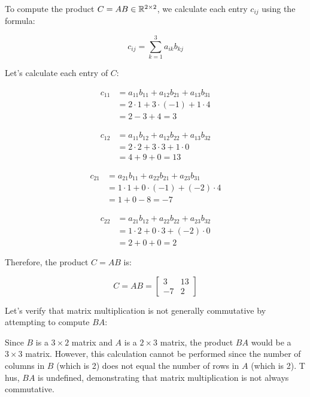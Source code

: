To compute the product \(C = AB \in \mathbb{R}^{2 \times 2}\), we calculate each entry \(c_{ij}\) using the formula:

\[
    c_{ij} = \sum_{k=1}^{3} a_{ik} b_{kj}
\]

Let's calculate each entry of \(C\):

\begin{align*}
    c_{11} & = a_{11}b_{11} + a_{12}b_{21} + a_{13}b_{31} \\
           & = 2 \cdot 1 + 3 \cdot (-1) + 1 \cdot 4       \\
           & = 2 - 3 + 4 = 3
\end{align*}

\begin{align*}
    c_{12} & = a_{11}b_{12} + a_{12}b_{22} + a_{13}b_{32} \\
           & = 2 \cdot 2 + 3 \cdot 3 + 1 \cdot 0          \\
           & = 4 + 9 + 0 = 13
\end{align*}

\begin{align*}
    c_{21} & = a_{21}b_{11} + a_{22}b_{21} + a_{23}b_{31} \\
           & = 1 \cdot 1 + 0 \cdot (-1) + (-2) \cdot 4    \\
           & = 1 + 0 - 8 = -7
\end{align*}

\begin{align*}
    c_{22} & = a_{21}b_{12} + a_{22}b_{22} + a_{23}b_{32} \\
           & = 1 \cdot 2 + 0 \cdot 3 + (-2) \cdot 0       \\
           & = 2 + 0 + 0 = 2
\end{align*}

Therefore, the product \(C = AB\) is:

\[
    C = AB =
    \begin{bmatrix}
        3  & 13 \\
        -7 & 2
    \end{bmatrix}
\]

Let's verify that matrix multiplication is not generally commutative by attempting to compute \(BA\):

Since \(B\) is a \(3 \times 2\) matrix and \(A\) is a \(2 \times 3\) matrix, the product \(BA\) would be a \(3 \times 3\) matrix. However, 
this calculation cannot be performed since the number of columns in \(B\) (which is 2) does not equal the number of rows in \(A\) (which is 2). T
hus, \(BA\) is undefined, demonstrating that matrix multiplication is not always commutative.

